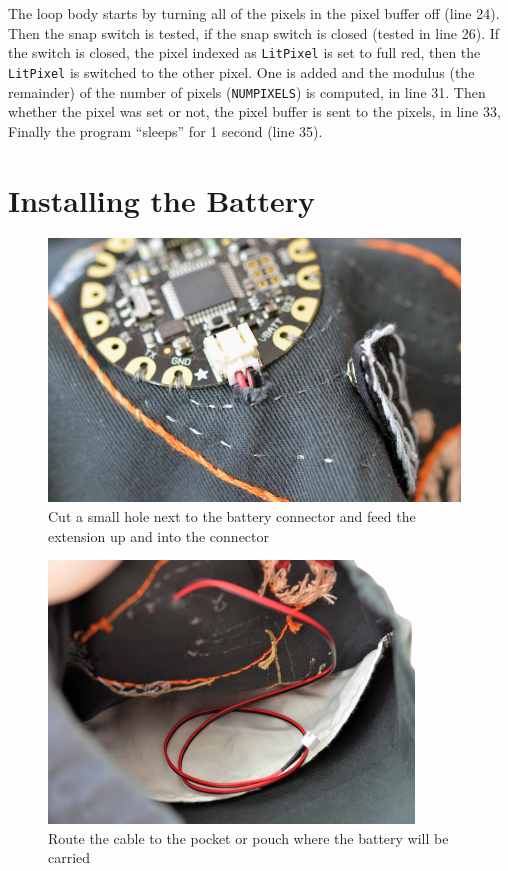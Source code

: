 \documentclass[letterpaper,twoside,12pt]{article}
\begin{document}
The loop body starts by turning all of the pixels in the pixel buffer off
(line 24). Then the snap switch is tested, if the snap switch is closed
(tested in line 26). If the switch is closed, the pixel indexed as
\texttt{LitPixel} is set to full red, then the \texttt{LitPixel} is switched
to the other pixel. One is added and the modulus (the remainder) of the number
of pixels (\texttt{NUMPIXELS}) is computed, in line 31. Then whether the
pixel was set or not, the pixel buffer is sent to the pixels, in line 33, 
Finally the program ``sleeps'' for 1 second (line 35).

\part{Installing the Battery}
\begin{figure}[hbpt]\begin{centering}%
\includegraphics[height=2.75in]{flora-angler-embroidery-28.jpg}
\caption{Cut a small hole next to the battery connector and feed the extension 
up and into the connector}
\label{fig:flora-angler-embroidery-28}
\end{centering}\end{figure}
\begin{figure}[hbpt]\begin{centering}%
\includegraphics[height=2.75in]{flora-angler-embroidery-29.jpg}
\caption{Route the cable to the pocket or pouch where the battery will be carried}
\label{fig:flora-angler-embroidery-29}
\end{centering}\end{figure}
\end{document}
